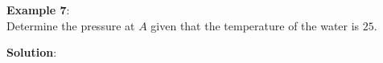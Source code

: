\documentclass[10pt]{amsart}
\begin{document}
\begin{minipage}[t]{0.45\textwidth}
\end{minipage}
\newpage
\begin{minipage}[t]{0.45\textwidth}	
	\raggedright
	\textbf{Example 7}:\\
	Determine the pressure at $A$ given that the temperature of the
	water is $25$\textcelsius.
	\par\vspace{5cm}
\end{minipage}
\hfill
\begin{minipage}[t]{0.5\textwidth}		
	\textbf{Solution}:
\end{minipage}
\end{document}
